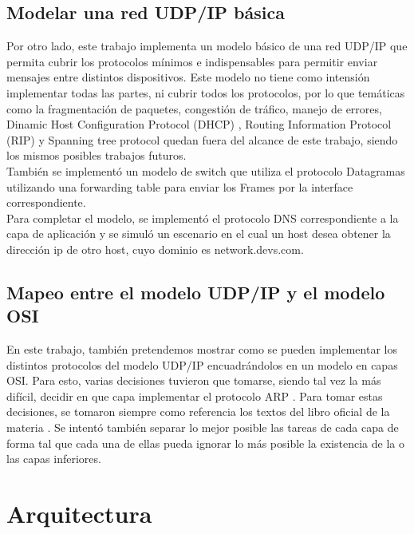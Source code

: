 \documentclass[10pt,a4paper]{article}
\begin{document}
\subsection{Modelar una red UDP/IP básica}

Por otro lado, este trabajo implementa un modelo básico de una red UDP/IP que permita cubrir los protocolos mínimos e indispensables para permitir enviar mensajes entre distintos dispositivos. Este modelo no tiene como intensión implementar todas las partes, ni cubrir todos los protocolos, por lo que temáticas como la fragmentación de paquetes, congestión de tráfico, manejo de errores, Dinamic Host Configuration Protocol (DHCP) \cite[p.~231]{peterson2011computer}, Routing Information Protocol (RIP)\cite[p.~243]{peterson2011computer} y Spanning tree protocol \cite[p.~194]{peterson2011computer} quedan fuera del alcance de este trabajo, siendo los mismos posibles trabajos futuros. \\

También se implementó un modelo de switch que utiliza el protocolo Datagramas \cite[p.~172]{peterson2011computer} utilizando una forwarding table para enviar los Frames por la interface correspondiente. \\

Para completar el modelo, se implementó el protocolo DNS correspondiente a la capa de aplicación y se simuló un escenario en el cual un host desea obtener la dirección ip de otro host, cuyo dominio es network.devs.com.

\subsection{Mapeo entre el modelo UDP/IP y el modelo OSI}

En este trabajo, también pretendemos mostrar como se pueden implementar los distintos protocolos del modelo UDP/IP encuadrándolos en un modelo en capas OSI. Para esto, varias decisiones tuvieron que tomarse, siendo tal vez la más difícil, decidir en que capa implementar el protocolo ARP \cite[p.~228]{peterson2011computer}. Para tomar estas decisiones, se tomaron siempre como referencia los textos del libro oficial de la materia \cite{peterson2011computer}. Se intentó también separar lo mejor posible las tareas de cada capa de forma tal que cada una de ellas pueda ignorar lo más posible la existencia de la o las capas inferiores.

\section{Arquitectura}
\end{document}
